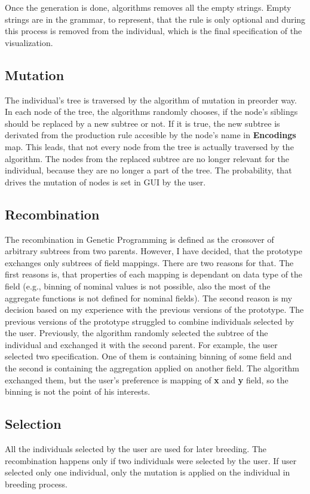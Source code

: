   Once the generation is done, algorithms removes all the empty strings. Empty strings are in the grammar, to represent, that the rule is only optional and during this process is removed from the individual, which is the final specification of the visualization.
  \subsection{Mutation}
  The individual's tree is traversed by the algorithm of mutation in preorder way. In each node of the tree, the algorithms randomly chooses, if the node's siblings should be replaced by a new subtree or not. If it is true, the new subtree is derivated from the production rule accesible by the node's name in \textbf{Encodings} map. This leads, that not every node from the tree is actually traversed by the algorithm. The nodes from the replaced subtree are no longer relevant for the individual, because they are no longer a part of the tree. The probability, that drives the mutation of nodes is set in GUI by the user.
  \subsection{Recombination}
  The recombination in Genetic Programming is defined as the crossover of arbitrary subtrees from two parents. However, I have decided, that the prototype exchanges only subtrees of field mappings. There are two reasons for that. The first reasons is, that properties of each mapping is dependant on data type of the field (e.g., binning of nominal values is not possible, also the most of the aggregate functions is not defined for nominal fields). The second reason is my decision based on my experience with the previous versions of the prototype. The previous versions of the prototype struggled to combine individuals selected by the user. Previously, the algorithm randomly selected the subtree of the individual and exchanged it with the second parent. For example, the user selected two specification. One of them is containing binning of some field and the second is containing the aggregation applied on another field. The algorithm exchanged them, but the user's preference is mapping of \textbf{x} and \textbf{y} field, so the binning is not the point of his interests.
  \subsection{Selection}
  All the individuals selected by the user are used for later breeding. The recombination happens only if two individuals were selected by the user. If user selected only one individual, only the mutation is applied on the individual in breeding process.
  \blindtext
